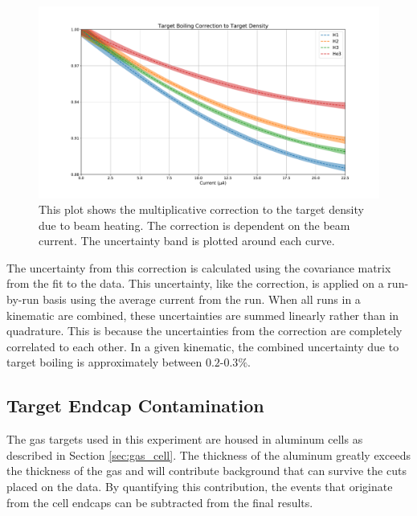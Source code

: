\begin{figure}
	\includegraphics[width=\textwidth]{./analysis/fig/boil_cor.pdf}
	\caption{This plot shows the multiplicative correction to the target density due to beam heating. The correction is dependent on the beam current. The uncertainty band is plotted around each curve.}
	\label{fig:boilcor}
\end{figure}


The uncertainty from this correction is calculated using the covariance matrix from the fit to the data. This uncertainty, like the correction, is applied on a run-by-run basis using the average current from the run. When all runs in a kinematic are combined, these uncertainties are summed linearly rather than in quadrature. This is because the uncertainties from the correction are completely correlated to each other. In a given kinematic, the combined uncertainty due to target boiling is approximately between $0.2$-$0.3\%$.

\subsection{Target Endcap Contamination}
\label{sec:ecc}

The gas targets used in this experiment are housed in aluminum cells as described in Section \ref{sec:gas_cell}. The thickness of the aluminum greatly exceeds the thickness of the gas and will contribute background that can survive the cuts placed on the data. By quantifying this contribution, the events that originate from the cell endcaps can be subtracted from the final results.

